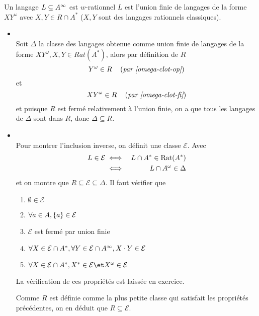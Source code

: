 \begin{prop}
	Un langage $L \subseteq A^{\infty}$ est $w$-rationnel \ssi $L$ est l'union finie de langages
	de la forme $XY^{\omega}$ avec $X,Y \in R \cap A^*$ ($X,Y$ sont des langages rationnels classiques).
\end{prop}

\begin{proofI}
	\begin{itemize}
		\item {} \\
		      Soit $\Delta$ la classe des langages obtenue comme union finie de langages de la forme $XY^{\omega}, X,Y \in Rat(A^*)$,
		      alors par définition de $R$
		      $$Y^{\omega} \in R \quad\left(\textit{par \ref{omega-clot-op}}\right)$$
		      et
		      $$XY^{\omega} \in R \quad\left(\textit{par \ref{omega-clot-fi}}\right)$$
		      et puisque $R$ est fermé relativement à l'union finie, on a que tous les langages de $\Delta$ sont dans $R$,
		      donc $\Delta \subseteq R$.
		\item {} \\

		      Pour montrer l'inclusion inverse, on définit une classe $\mathcal{E}$.
		      Avec
		      \begin{eqnarray*}
			      L \in \mathcal{E} &\iff& L \cap A^* \in \text{Rat}(A^*) \\
			      &\iff& L \cap A^{\omega} \in \Delta
		      \end{eqnarray*}
		      et on montre que $R \subseteq \mathcal{E} \subseteq \Delta$.
		      Il faut vérifier que
		      \begin{enumerate}
			      \item $\emptyset \in \mathcal{E}$
			      \item $\forall a \in A, \left\{a\right\} \in  \mathcal{E}$
			      \item $\mathcal{E}$ est fermé par union finie

			      \item $\forall X \in \mathcal{E} \cap A^*, \forall Y \in \mathcal{E} \cap A^{\infty}, X \cdot Y \in \mathcal{E}$
			      \item $\forall X \in \mathcal{E} \cap A^*, X^* \in \mathcal{E} \et X^{\omega} \in \mathcal{E}$
		      \end{enumerate}
		      La vérification de ces propriétés est laissée en exercice.

		      Comme $R$ est définie comme la plus petite classe qui satisfait
		      les propriétés précédentes, on en déduit que $R \subseteq \mathcal{E}$.
	\end{itemize}
\end{proofI}


